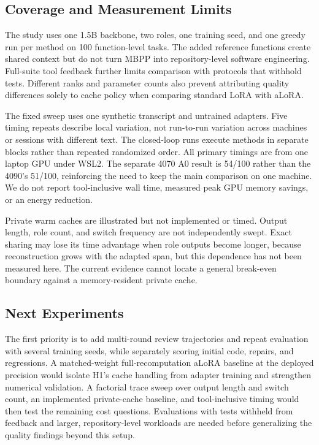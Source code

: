 \documentclass[10pt,twocolumn,letterpaper]{article}
\begin{document}
\subsection{Coverage and Measurement Limits}
The study uses one 1.5B backbone, two roles, one training seed, and one
greedy run per method on 100 function-level tasks. The added reference
functions create shared context but do not turn MBPP into repository-level
software engineering. Full-suite tool feedback further limits comparison
with protocols that withhold tests. Different ranks and parameter counts
also prevent attributing quality differences solely to cache policy when
comparing standard LoRA with aLoRA.

The fixed sweep uses one synthetic transcript and untrained adapters.
Five timing repeats describe local variation, not run-to-run variation
across machines or sessions with different text. The closed-loop runs
execute methods in separate blocks rather than repeated randomized order.
All primary timings are from one laptop GPU under WSL2. The separate
4070 A0 result is 54/100 rather than the 4090's 51/100, reinforcing the need
to keep the main comparison on one machine. We do not report tool-inclusive
wall time, measured peak GPU
memory savings, or an energy reduction.

Private warm caches are illustrated but not implemented or timed. Output
length, role count, and switch frequency are not independently swept.
Exact sharing may lose its time advantage when role outputs become longer,
because reconstruction grows with the adapted span, but this dependence
has not been measured here. The current evidence cannot locate a general
break-even boundary against a memory-resident private cache.

\subsection{Next Experiments}
The first priority is to add multi-round review trajectories and repeat
evaluation with several training seeds, while separately scoring initial
code, repairs, and regressions. A matched-weight full-recomputation aLoRA
baseline at the deployed precision would isolate H1's cache handling from
adapter training and strengthen numerical validation. A factorial trace
sweep over output length and switch count, an implemented private-cache
baseline, and tool-inclusive timing would then test the remaining cost
questions. Evaluations with tests withheld from feedback and larger,
repository-level workloads are needed before generalizing the quality
findings beyond this setup.
\end{document}
